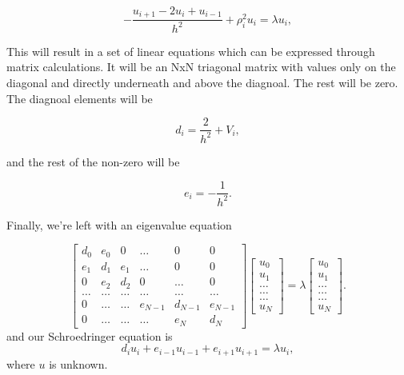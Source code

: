 \documentclass[10pt]{article}
\begin{document}
\begin{multicols}{2}
\begin{equation}
-\frac{u_{i+1} -2u_i +u_{i-1} }{h^2}+\rho_i^2u_i  = \lambda u_i,
\end{equation}

This will result in a set of linear equations which can be expressed
through matrix calculations. It will be an NxN triagonal matrix with values
only on the diagonal and directly underneath and above the diagnoal. The
rest will be zero. The diagnoal elements will be

\begin{equation*}
   d_i=\frac{2}{h^2}+V_i,
\end{equation*}

and the rest of the non-zero will be

\begin{equation*}
   e_i=-\frac{1}{h^2}.
\end{equation*}

Finally, we're left with an eigenvalue equation


\begin{equation*}
    \begin{bmatrix}
        d_0    & e_0   & 0      & \dots & 0     & 0 \\
        e_1    & d_1   & e_1    & \dots & 0     &0 \\
        0      & e_2   & d_2    & 0     & \dots & 0\\
        \dots  & \dots & \dots  & \dots & \dots & \dots\\
        0      & \dots & \dots  & e_{N-1}     &d_{N-1} & e_{N-1}\\
        0      & \dots & \dots  & \dots & e_{N} & d_{N}
    \end{bmatrix}
    \begin{bmatrix} 
        u_{0} \\ u_{1} \\ \dots\\ \dots\\ \dots\\ u_{N} 
    \end{bmatrix}
    =\lambda \begin{bmatrix} 
        u_{0} \\ u_{1} \\ \dots\\ \dots\\ \dots\\ u_{N}
    \end{bmatrix}.  
    \label{eq:sematrix}
\end{equation*}
and our Schroedringer equation is
\begin{equation*}
d_iu_i+e_{i-1}u_{i-1}+e_{i+1}u_{i+1}  = \lambda u_i,
\end{equation*}
where $u$ is unknown. 

\end{multicols}
\end{document}
